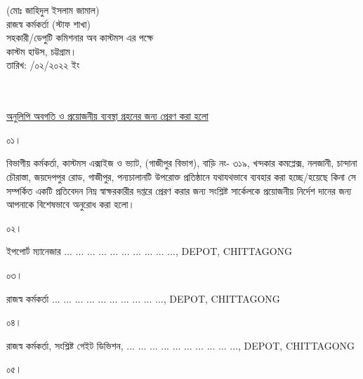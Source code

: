 \documentclass[12pt]{article}
\newcommand{\fileno}{}
\newcommand{\depo}{... ... ... ... ... ... ... ... ... ..., DEPOT, CHITTAGONG}
\newcommand{\rodt}{তারিখ: \hspace{2.0em}/০২/২০২২ ইং}
\begin{document}
\begin{minipage}[t]{0.40\linewidth}
\begin{center}
\footnotesize{(মোঃ জাহিদুল ইসলাম জামাল)}
\\
\footnotesize{রাজস্ব কর্মকর্তা (স্টাফ শাখা)}
\\
\scriptsize{সহকারী/ডেপুটি কমিশনার অব কাস্টমস এর পক্ষে}
\\
\scriptsize{কাস্টম হাউস, চট্টগ্রাম।}
\\
\scriptsize{{\rodt}}
\end{center}
\end{minipage}
\\
\scriptsize{{\fileno}}
\\
\underline{\scriptsize{অনুলিপি অবগতি ও প্রয়োজনীয় ব্যবস্থা গ্রহনের জন্য প্রেরণ করা হলো}}
\\
\begin{minipage}[t]{0.06\linewidth}
\scriptsize{০১।}
\end{minipage}
\begin{minipage}[t]{0.94\linewidth}
\scriptsize{বিভাগীয় কর্মকর্তা, কাস্টমস এক্সাইজ ও ভ্যাট, (গাজীপুর বিভাগ),
বাড়ি নং- ৩১৯,
খন্দকার কমপ্লেক্স, নলজানী,
চান্দানা চৌরাস্তা, জয়দেপপুর রোড,
গাজীপুর,
পন্যচালানটি উপরোক্ত প্রতিষ্ঠানে যথাযথভাবে
ব্যবহার করা হচ্ছে/হয়েছে কিনা সে
সম্পর্কিত একটি প্রতিবেদন নিম্ন স্বাক্ষরকারীর
দপ্তরে প্রেরণ করার জন্য সংশ্লিষ্ট সার্কেলকে
প্রয়োজনীয় নির্দেশ দানের জন্য আপনাকে
বিশেষভাবে অনুরোধ করা হলো।}
\end{minipage}
\begin{minipage}[t]{0.06\linewidth}
\scriptsize{০২।}
\end{minipage}
\begin{minipage}[t]{0.94\linewidth}
\scriptsize{ইপপোর্ট ম্যানেজার {\depo}}
\end{minipage}
\begin{minipage}[t]{0.06\linewidth}
\scriptsize{০৩।}
\end{minipage}
\begin{minipage}[t]{0.94\linewidth}
\scriptsize{রাজস্ব কর্মকর্তা {\depo}}
\end{minipage}
\begin{minipage}[t]{0.06\linewidth}
\scriptsize{০৪।}
\end{minipage}
\begin{minipage}[t]{0.94\linewidth}
\scriptsize{রাজস্ব কর্মকর্তা, সংশ্লিষ্ট গেইট ডিভিশন, {\depo}}
\end{minipage}
\begin{minipage}[t]{0.06\linewidth}
\scriptsize{০৫।}
\end{minipage}
\end{document}
